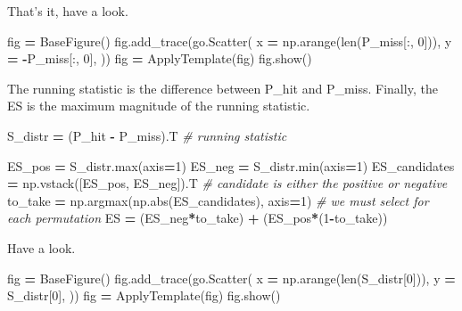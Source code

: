 \documentclass[
]{book}
\newenvironment{Shaded}{\begin{snugshade}}{\end{snugshade}}
\newcommand{\BuiltInTok}[1]{#1}
\newcommand{\CommentTok}[1]{\textcolor[rgb]{0.56,0.35,0.01}{\textit{#1}}}
\newcommand{\DecValTok}[1]{\textcolor[rgb]{0.00,0.00,0.81}{#1}}
\newcommand{\NormalTok}[1]{#1}
\newcommand{\OperatorTok}[1]{\textcolor[rgb]{0.81,0.36,0.00}{\textbf{#1}}}
\begin{document}
That's it, have a look.

\begin{Shaded}
\begin{Highlighting}[numbers=left,,]
\NormalTok{fig }\OperatorTok{=}\NormalTok{ BaseFigure()}
\NormalTok{fig.add\_trace(go.Scatter(}
\NormalTok{    x }\OperatorTok{=}\NormalTok{ np.arange(}\BuiltInTok{len}\NormalTok{(P\_miss[:, }\DecValTok{0}\NormalTok{])),}
\NormalTok{    y }\OperatorTok{=} \OperatorTok{{-}}\NormalTok{P\_miss[:, }\DecValTok{0}\NormalTok{],}
\NormalTok{))}
\NormalTok{fig }\OperatorTok{=}\NormalTok{ ApplyTemplate(fig)}
\NormalTok{fig.show()}
\end{Highlighting}
\end{Shaded}

The running statistic is the difference between P\_hit and P\_miss.
Finally, the ES is the maximum magnitude of the running statistic.

\begin{Shaded}
\begin{Highlighting}[numbers=left,,]
\NormalTok{S\_distr }\OperatorTok{=}\NormalTok{ (P\_hit }\OperatorTok{{-}}\NormalTok{ P\_miss).T }\CommentTok{\# running statistic}

\NormalTok{ES\_pos }\OperatorTok{=}\NormalTok{ S\_distr.}\BuiltInTok{max}\NormalTok{(axis}\OperatorTok{=}\DecValTok{1}\NormalTok{)}
\NormalTok{ES\_neg }\OperatorTok{=}\NormalTok{ S\_distr.}\BuiltInTok{min}\NormalTok{(axis}\OperatorTok{=}\DecValTok{1}\NormalTok{)}
\NormalTok{ES\_candidates }\OperatorTok{=}\NormalTok{ np.vstack([ES\_pos, ES\_neg]).T       }\CommentTok{\# candidate is either the positive or negative}
\NormalTok{to\_take }\OperatorTok{=}\NormalTok{ np.argmax(np.}\BuiltInTok{abs}\NormalTok{(ES\_candidates), axis}\OperatorTok{=}\DecValTok{1}\NormalTok{)  }\CommentTok{\# we must select for each permutation}
\NormalTok{ES }\OperatorTok{=}\NormalTok{ (ES\_neg}\OperatorTok{*}\NormalTok{to\_take) }\OperatorTok{+}\NormalTok{ (ES\_pos}\OperatorTok{*}\NormalTok{(}\DecValTok{1}\OperatorTok{{-}}\NormalTok{to\_take))}
\end{Highlighting}
\end{Shaded}

Have a look.

\begin{Shaded}
\begin{Highlighting}[numbers=left,,]
\NormalTok{fig }\OperatorTok{=}\NormalTok{ BaseFigure()}
\NormalTok{fig.add\_trace(go.Scatter(}
\NormalTok{    x }\OperatorTok{=}\NormalTok{ np.arange(}\BuiltInTok{len}\NormalTok{(S\_distr[}\DecValTok{0}\NormalTok{])),}
\NormalTok{    y }\OperatorTok{=}\NormalTok{ S\_distr[}\DecValTok{0}\NormalTok{],}
\NormalTok{))}
\NormalTok{fig }\OperatorTok{=}\NormalTok{ ApplyTemplate(fig)}
\NormalTok{fig.show()}
\end{Highlighting}
\end{Shaded}
\end{document}
